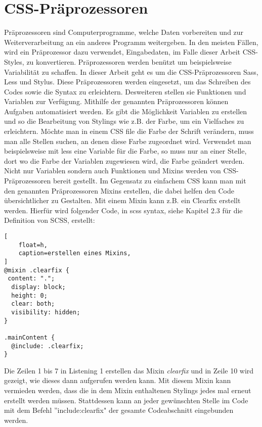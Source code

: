 \section{CSS-Präprozessoren}
Präprozessoren sind Computerprogramme, welche Daten vorbereiten und zur Weiterverarbeitung an ein anderes Programm weitergeben. In den meisten Fällen, wird ein Präprozessor dazu verwendet, Eingabedaten, im Falle dieser Arbeit CSS-Styles, zu konvertieren.\autocite[]{Peter.2012}\newline
Präprozessoren werden benützt um beispielsweise Variabilität zu schaffen.
In dieser Arbeit geht es um die CSS-Präprozessoren Sass, Less und Stylus. Diese Präprozessoren werden eingesetzt, um das Schreiben des Codes sowie die Syntax zu erleichtern. Desweiteren stellen sie Funktionen und Variablen zur Verfügung. \newline
Mithilfe der genannten Präprozessoren können Aufgaben automatisiert werden. Es gibt die Möglichkeit Variablen zu erstellen und so die Bearbeitung von Stylings wie z.B. der Farbe, um ein Vielfaches zu erleichtern. Möchte man in einem CSS file die Farbe der Schrift verändern, muss man alle Stellen suchen, an denen diese Farbe zugeordnet wird. Verwendet man beispielsweise mit less eine Variable für die Farbe, so muss nur an einer Stelle, dort wo die Farbe der Variablen zugewiesen wird, die Farbe geändert werden.\newline
Nicht nur Variablen sondern auch Funktionen und Mixins werden von CSS-Präprozessoren bereit gestellt. Im Gegensatz zu einfachem CSS kann man mit den genannten Präprozessoren Mixins erstellen, die dabei helfen den Code übersichtlicher zu Gestalten. Mit einem Mixin kann z.B. ein Clearfix erstellt werden. Hierfür wird folgender Code, in scss syntax, siehe Kapitel 2.3 für die Definition von SCSS, erstellt:
\begin{lstlisting}[
	float=h,
	caption=erstellen eines Mixins,
]
@mixin .clearfix {
 content: ".";
  display: block;
  height: 0;
  clear: both;
  visibility: hidden;
}

.mainContent {
  @include: .clearfix;
}
\end{lstlisting}
\newline
Die Zeilen 1 bis 7 in Listening 1 erstellen das Mixin \textit{clearfix} und in Zeile 10 wird gezeigt, wie dieses dann aufgerufen werden kann. Mit diesem Mixin kann vermieden werden, dass die in dem Mixin enthaltenen Stylings jedes mal erneut erstellt werden müssen. Stattdessen kann an jeder gewünschten Stelle im Code mit dem Befehl ''include:clearfix" der gesamte Codeabschnitt eingebunden werden.

